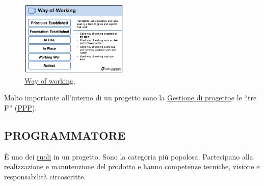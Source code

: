 		\begin{figure}[H]
			\centering
			\includegraphics[width=0.46\textwidth]{img/cards/way}
			\caption{\underline{\hyperref[way]{Way of working}}.}
		\end{figure}

		Molto importante all'interno di un progetto sono la \underline{\hyperref[gestioneprogetto]{Gestione di progetto}}e le ``tre P'' (\underline{\hyperref[3p]{PPP}}).


		\subsection{PROGRAMMATORE}  \label{programmatore}
		È uno dei \underline{\hyperref[ruoli]{ruoli}} in un progetto. Sono la categoria più popolosa. Partecipano alla realizzazione e manutenzione del prodotto e hanno competenze tecniche, visione e responsabilità circoscritte.


